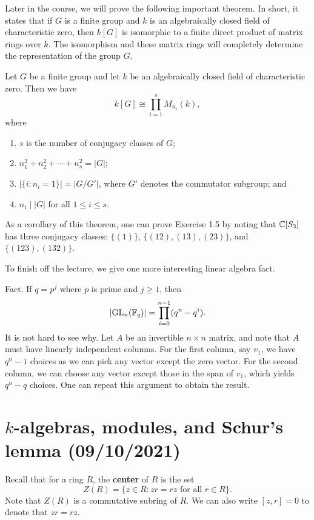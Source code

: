 Later in the course, we will prove the following important theorem. In short, it states that if 
$G$ is a finite group and $k$ is an algebraically closed field of characteristic zero, then $k[G]$ is
isomorphic to a finite direct product of matrix rings over $k$. The isomorphism and these matrix rings
will completely determine the representation of the group $G$. 

\begin{theo}{}
Let $G$ be a finite group and let $k$ be an algebraically closed field of characteristic zero. 
Then we have 
\[ k[G] \cong \prod_{i=1}^s M_{n_i}(k), \]
where
\begin{enumerate}[(1)]
    \item $s$ is the number of conjugacy classes of $G$;
    \item $n_1^2 + n_2^2 + \cdots + n_s^2 = |G|$;
    \item $|\{i : n_i = 1\}| = |G/G'|$, where $G'$ denotes the commutator subgroup; and 
    \item $n_i \mid |G|$ for all $1 \leq i \leq s$. 
\end{enumerate}
\end{theo}

As a corollary of this theorem, one can prove Exercise 1.5 by noting that $\mathbb{C}[S_3]$ has three 
conjugacy classes: $\{(1)\}$, $\{(12), (13), (23)\}$, and $\{(123), (132)\}$. 

To finish off the lecture, we give one more interesting linear algebra fact. 

{\sc Fact.} If $q = p^j$ where $p$ is prime and $j \geq 1$, then 
\[ \lvert\operatorname{GL}_n(\mathbb{F}_q)\rvert = \prod_{i=0}^{n-1} (q^n - q^i). \]
It is not hard to see why. Let $A$ be an invertible $n \times n$ matrix, and note that $A$ must 
have linearly independent columns. For the first column, say $v_1$, we have 
$q^n - 1$ choices as we can pick any vector except the zero vector. For the second column, 
we can choose any vector except those in the span of $v_1$, which yields $q^n - q$ choices. 
One can repeat this argument to obtain the result. 

\section{$k$-algebras, modules, and Schur's lemma (09/10/2021)}

Recall that for a ring $R$, the {\bf center} of $R$ is the set 
\[ Z(R) = \{z \in R : zr = rz \text{ for all } r \in R\}. \]
Note that $Z(R)$ is a commutative subring of $R$. We can also write $[z, r] = 0$ to 
denote that $zr = rz$. 


